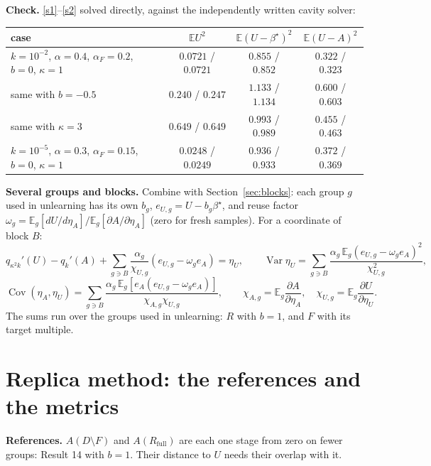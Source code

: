 \documentclass[10pt]{article}
\newcommand{\bs}{\beta^\star}\newcommand{\E}{\mathbb E}\newcommand{\asinh}{\operatorname{arcsinh}}\newcommand{\sk}{\sqrt k}
\newcommand{\Rf}{R_{\mathrm{full}}}\newcommand{\Ff}{F_{\mathrm{full}}}\newcommand{\dSh}{d_{\mathrm{Sh}}}
\begin{document}
\textbf{Check.} \eqref{s1}--\eqref{s2} solved directly, against the independently written cavity solver:
\begin{center}\small\begin{tabular}{@{}lccc@{}}\toprule
case & $\E U^2$ & $\E(U-\bs)^2$ & $\E(U-A)^2$\\\midrule
$k=10^{-2}$, $\alpha=0.4$, $\alpha_F=0.2$, $b=0$, $\kappa=1$ & $0.0721$ / $0.0721$ & $0.855$ / $0.852$ & $0.322$ / $0.323$\\
same with $b=-0.5$ & $0.240$ / $0.247$ & $1.133$ / $1.134$ & $0.600$ / $0.603$\\
same with $\kappa=3$ & $0.649$ / $0.649$ & $0.993$ / $0.989$ & $0.455$ / $0.463$\\
$k=10^{-5}$, $\alpha=0.3$, $\alpha_F=0.15$, $b=0$, $\kappa=1$ & $0.0248$ / $0.0249$ & $0.936$ / $0.933$ & $0.372$ / $0.369$\\\bottomrule
\end{tabular}\end{center}

\textbf{Several groups and blocks.} Combine with Section~\ref{sec:blocks}: each group $g$ used in unlearning has its own $b_g$, $e_{U,g}=U-b_g\bs$, and reuse factor $\omega_g=\E_g[dU/d\eta_A]\big/\E_g[\partial A/\partial\eta_A]$ (zero for fresh samples). For a coordinate of block $B$:
\begin{equation}\label{s2g}
q_{\kappa^2k}'(U)-q_k'(A)+\sum_{g\ni B}\frac{\alpha_g}{\chi_{U,g}}(e_{U,g}-\omega_ge_A)=\eta_U,\qquad
\operatorname{Var}\eta_U=\sum_{g\ni B}\frac{\alpha_g\,\E_g(e_{U,g}-\omega_ge_A)^2}{\chi_{U,g}^2},
\end{equation}
\[
\operatorname{Cov}(\eta_A,\eta_U)=\sum_{g\ni B}\frac{\alpha_g\,\E_g[e_A(e_{U,g}-\omega_ge_A)]}{\chi_{A,g}\chi_{U,g}},\qquad\chi_{A,g}=\E_g\frac{\partial A}{\partial\eta_A},\quad\chi_{U,g}=\E_g\frac{\partial U}{\partial\eta_U}.
\]
The sums run over the groups used in unlearning: $R$ with $b=1$, and $F$ with its target multiple.

\section{Replica method: the references and the metrics}\label{sec:refs}
\textbf{References.} $A(D\setminus F)$ and $A(\Rf)$ are each one stage from zero on fewer groups: Result 14 with $b=1$. Their distance to $U$ needs their overlap with it.
\end{document}
